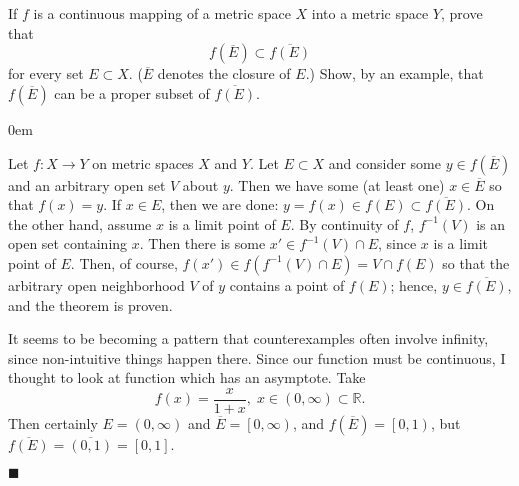 \documentclass[12pt]{article}
\renewcommand{\qed}{\hfill$\blacksquare$}
\renewenvironment{proof}{\begin{addmargin}[1em]{0em}\begin{newproof}}{\end{newproof}\end{addmargin}\qed}
\newenvironment{problem}[2][Exercise]{\begin{trivlist}
\item[\hskip \labelsep {\bfseries #1}\hskip \labelsep {\bfseries #2.}]}{\end{trivlist}}
\begin{document}
\begin{problem}{4.2}
If $f$ is a continuous mapping of a metric space $X$ into a metric space $Y$, prove that $$ f\left(\overline{E}\right) \subset \overline{f\left(E\right)} $$ for every set $E\subset X$. ($\overline{E}$ denotes the closure of $E$.) Show, by an example, that $f\left(\overline{E}\right)$ can be a proper subset of $\overline{f\left(E\right)}$.
\end{problem}
\begin{proof}
Let $f:X\rightarrow Y$ on metric spaces $X$ and $Y$. Let $E\subset X$ and consider some $y\in f\left(\overline{E}\right)$ and an arbitrary open set $V$ about $y$. Then we have some (at least one) $x\in \overline{E}$ so that $f\left(x\right) =y$. If $x\in E$, then we are done: $y=f\left(x\right) \in f\left(E\right) \subset \overline{f\left(E\right)}$. On the other hand, assume $x$ is a limit point of $E$. By continuity of $f$, $f^{-1}\left(V\right)$ is an open set containing $x$. Then there is some $x' \in f^{-1}\left(V\right)\cap E$, since $x$ is a limit point of $E$. Then, of course, $f\left(x'\right) \in f\left(f^{-1}\left(V\right)\cap E\right) = V\cap f\left(E\right)$ so that the arbitrary open neighborhood $V$ of $y$ contains a point of $f\left(E\right)$; hence, $y \in \overline{f\left(E\right)}$, and the theorem is proven.

It seems to be becoming a pattern that counterexamples often involve infinity, since non-intuitive things happen there. Since our function must be continuous, I thought to look at function which has an asymptote. Take $$ f\left(x\right) = \frac{x}{1+x}, \; x\in\left(0,\infty\right) \subset \mathbb{R}. $$ Then certainly $E=\left(0,\infty\right)$ and $\overline{E}=\left[0,\infty\right)$, and $f\left(\overline{E}\right)=\left[0,1\right)$, but $\overline{f\left(E\right)} = \overline{\left(0,1\right)}=\left[0,1\right].$
\end{proof}
\end{document}
